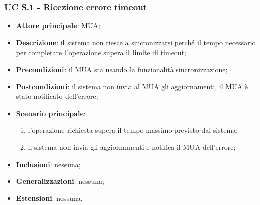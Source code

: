     \subsubsection{UC S.1 - Ricezione errore timeout} \label{sec:UCS.1}
    \begin{itemize}
        \item \textbf{Attore principale}: MUA;
        \item \textbf{Descrizione}: il sistema non riesce a sincronizzarsi perché il tempo necessario per completare l'operazione supera il limite di timeout;
        \item \textbf{Precondizioni}: il MUA sta usando la funzionalità sincronizzazione;
        \item \textbf{Postcondizioni}: il sistema non invia al MUA gli aggiornamenti, il MUA è stato notificato dell'errore;
        \item \textbf{Scenario principale}:
            \begin{enumerate}
                \item l'operazione richiesta supera il tempo massimo previsto dal sistema;
                \item il sistema non invia gli aggiornamenti e notifica il MUA dell'errore;
            \end{enumerate}
        \item \textbf{Inclusioni}: nessuna;
        \item \textbf{Generalizzazioni}: nessuna;
        \item \textbf{Estensioni}: nessuna.
    \end{itemize}

